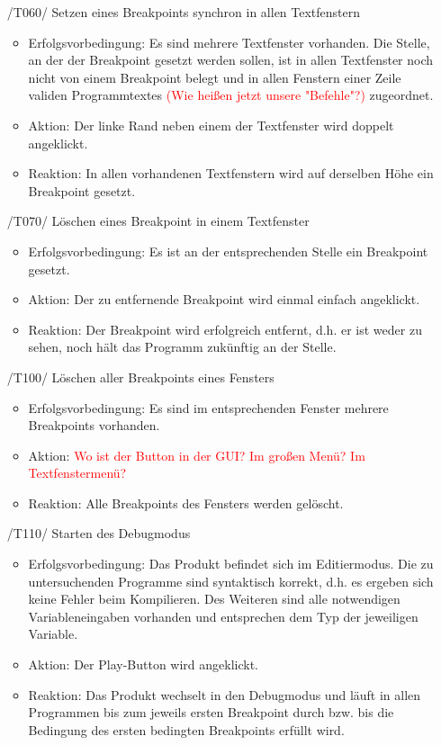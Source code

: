 \documentclass[parskip=full]{scrartcl}
\newcommand\frage[1]{\textcolor{red}{#1}}
\begin{document}
\begin{itemize}

	\item[/T060/] Setzen eines \glspl{Breakpoint} synchron in allen Textfenstern
	\begin{itemize}
		\item Erfolgsvorbedingung: Es sind mehrere Textfenster vorhanden. Die Stelle, an der der Breakpoint gesetzt werden sollen, ist in allen Textfenster noch nicht von einem Breakpoint belegt und in allen Fenstern einer Zeile validen Programmtextes \frage{(Wie heißen jetzt unsere "Befehle"?)} zugeordnet. 
		\item Aktion: Der linke Rand neben einem der Textfenster wird doppelt angeklickt.	
		\item Reaktion:	In allen vorhandenen Textfenstern wird auf derselben Höhe ein Breakpoint gesetzt.
	\end{itemize}		
	
	\item[/T070/] Löschen eines Breakpoint in einem Textfenster
		\begin{itemize}
		\item Erfolgsvorbedingung: Es ist an der entsprechenden Stelle ein Breakpoint gesetzt.	
		\item Aktion: Der zu entfernende Breakpoint wird einmal einfach angeklickt.
		\item Reaktion:	Der \gls{Breakpoint} wird erfolgreich entfernt, d.h. er ist weder zu sehen, noch hält das Programm zukünftig an der Stelle.
		\end{itemize}		
		
		
	\item[/T100/] Löschen aller Breakpoints eines Fensters
		\begin{itemize}
		\item Erfolgsvorbedingung: Es sind im entsprechenden Fenster mehrere Breakpoints vorhanden.
		\item Aktion: \frage{Wo ist der Button in der GUI? Im großen Menü? Im Textfenstermenü?}
		\item Reaktion:	Alle Breakpoints des Fensters werden gelöscht.
		\end{itemize}		
	
	\item[/T110/] Starten des \gls{Debugmodus}
		\begin{itemize}
		\item Erfolgsvorbedingung: Das Produkt befindet sich im \gls{Editiermodus}. Die zu untersuchenden Programme sind syntaktisch korrekt, d.h. es ergeben sich keine Fehler beim Kompilieren. Des Weiteren sind alle notwendigen Variableneingaben vorhanden und entsprechen dem Typ der jeweiligen Variable.
		\item Aktion: Der Play-Button wird angeklickt.
		\item Reaktion:	Das Produkt wechselt in den Debugmodus und läuft in allen Programmen bis zum jeweils ersten Breakpoint durch bzw. bis die Bedingung des ersten bedingten Breakpoints erfüllt wird.
		\end{itemize}		
	

\end{itemize}
\end{document}
